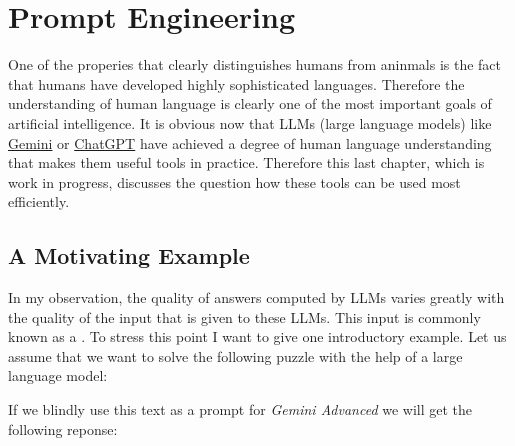\chapter{Prompt Engineering}
One of the properies that clearly distinguishes humans from aninmals is the fact that humans have developed
highly sophisticated languages.  Therefore the understanding of human language is clearly one of the most
important goals of artificial intelligence.  It is obvious now that LLMs (large language models) like
\href{https://gemini.google.com/}{Gemini} or \href{https://chat.openai.com/}{ChatGPT} have achieved a degree of
human language understanding that makes them useful tools in practice.  Therefore this last chapter, which
is work in progress, discusses the question how these tools can be used most efficiently.

\section{A Motivating Example}
In my observation, the quality of answers computed by LLMs varies greatly with the quality of the input that is
given to these LLMs.  This input is commonly known as a .  To stress this point I want to give
one introductory example.  Let us assume that we want to solve the following puzzle with the help of a large language model:

\begin{center}
\colorbox{green}{}
\end{center}


If we blindly use this text as a prompt for  \textsl{Gemini Advanced} we will get the following reponse:

